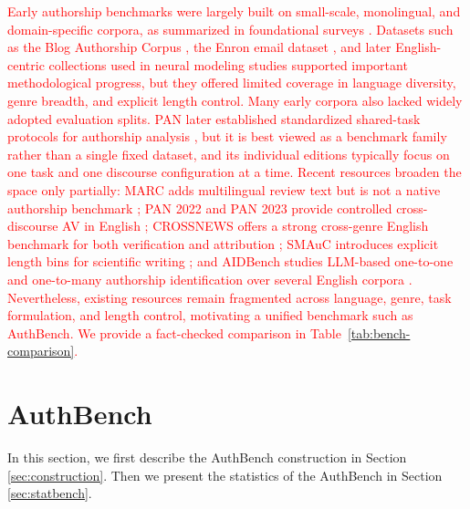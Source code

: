 \documentclass[11pt]{article}
\newcommand{\rev}[1]{\textcolor{red}{#1}}
\begin{document}
\fi
\rev{Early authorship benchmarks were largely built on small-scale, monolingual, and domain-specific corpora, as summarized in foundational surveys \citep{stamatatos2009survey, neal2017surveying}. Datasets such as the Blog Authorship Corpus \citep{schler2006effects}, the Enron email dataset \citep{klimt2004enron}, and later English-centric collections used in neural modeling studies \citep{ruder2016character, jafariakinabad2019styleaware} supported important methodological progress, but they offered limited coverage in language diversity, genre breadth, and explicit length control. Many early corpora also lacked widely adopted evaluation splits. PAN later established standardized shared-task protocols for authorship analysis \citep{potthast2016whowrote,bevendorff2020pan}, but it is best viewed as a benchmark family rather than a single fixed dataset, and its individual editions typically focus on one task and one discourse configuration at a time. Recent resources broaden the space only partially: MARC adds multilingual review text but is not a native authorship benchmark \citep{keung2020marc}; PAN 2022 and PAN 2023 provide controlled cross-discourse AV in English \citep{pan2022av,pan2023av}; CROSSNEWS offers a strong cross-genre English benchmark for both verification and attribution \citep{ma2025crossnews}; SMAuC introduces explicit length bins for scientific writing \citep{bevendorff2023smauc}; and AIDBench studies LLM-based one-to-one and one-to-many authorship identification over several English corpora \citep{wen2024aidbench}. Nevertheless, existing resources remain fragmented across language, genre, task formulation, and length control, motivating a unified benchmark such as AuthBench. We provide a fact-checked comparison in Table~\ref{tab:bench-comparison}.}

\section{AuthBench}
\label{sec:overview}
In this section, we first describe the AuthBench construction in Section \ref{sec:construction}. Then we present the statistics of the AuthBench in Section \ref{sec:statbench}.
\end{document}
